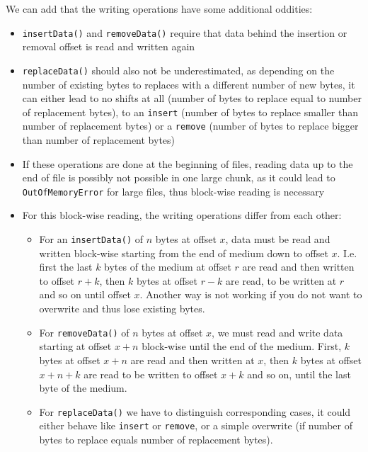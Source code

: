 We can add that the writing operations have some additional oddities:
\begin{itemize}
\item \texttt{insertData()} and \texttt{removeData()} require that data behind the insertion or removal offset is read and written again
\item \texttt{replaceData()} should also not be underestimated, as depending on the number of existing bytes to replaces with a different number of new bytes, it can either lead to no shifts at all (number of bytes to replace equal to number of replacement bytes), to an \texttt{insert} (number of bytes to replace smaller than number of replacement bytes) or a \texttt{remove} (number of bytes to replace bigger than number of replacement bytes)
\item If these operations are done at the beginning of files, reading data up to the end of file is possibly not possible in one large chunk, as it could lead to \texttt{OutOfMemoryError} for large files, thus block-wise reading is necessary
\item For this block-wise reading, the writing operations differ from each other:
\begin{itemize}
\item For an \texttt{insertData()} of $n$ bytes at offset $x$, data must be read and written block-wise starting from the end of medium down to offset $x$. I.e. first the last $k$ bytes of the medium at offset $r$ are read and then written to offset $r+k$, then $k$ bytes at offset $r-k$ are read, to be written at $r$ and so on until offset $x$. Another way is not working if you do not want to overwrite and thus lose existing bytes.
\item For \texttt{removeData()} of $n$ bytes at offset $x$, we must read and write data starting at offset $x+n$ block-wise until the end of the medium. First, $k$ bytes at offset $x+n$ are read and then written at $x$, then $k$ bytes at offset $x+n+k$ are read to be written to offset $x+k$ and so on, until the last byte of the medium.
\item For \texttt{replaceData()} we have to distinguish corresponding cases, it could either behave like \texttt{insert} or \texttt{remove}, or a simple overwrite (if number of bytes to replace equals number of replacement bytes).
\end{itemize}
\end{itemize}

